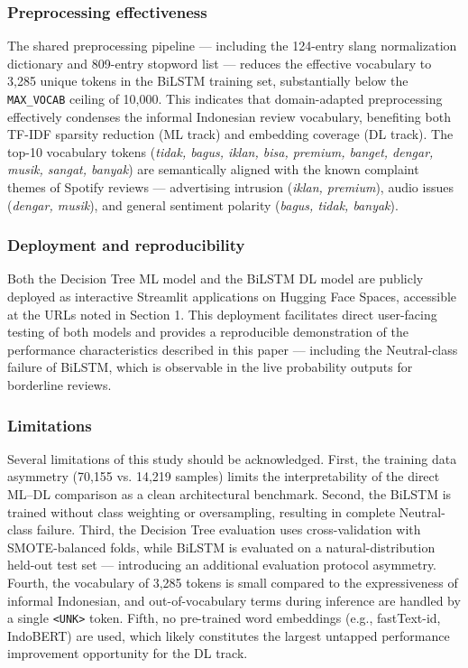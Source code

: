 \documentclass{article}
\begin{document}
\subsubsection*{Preprocessing effectiveness}
The shared preprocessing pipeline --- including the 124-entry slang normalization dictionary and 809-entry stopword list --- reduces the effective vocabulary to 3,285 unique tokens in the BiLSTM training set, substantially below the \texttt{MAX\_VOCAB} ceiling of 10,000. This indicates that domain-adapted preprocessing effectively condenses the informal Indonesian review vocabulary, benefiting both TF-IDF sparsity reduction (ML track) and embedding coverage (DL track). The top-10 vocabulary tokens (\textit{tidak, bagus, iklan, bisa, premium, banget, dengar, musik, sangat, banyak}) are semantically aligned with the known complaint themes of Spotify reviews --- advertising intrusion (\textit{iklan, premium}), audio issues (\textit{dengar, musik}), and general sentiment polarity (\textit{bagus, tidak, banyak}).

\subsubsection*{Deployment and reproducibility}
Both the Decision Tree ML model and the BiLSTM DL model are publicly deployed as interactive Streamlit applications on Hugging Face Spaces, accessible at the URLs noted in Section 1. This deployment facilitates direct user-facing testing of both models and provides a reproducible demonstration of the performance characteristics described in this paper --- including the Neutral-class failure of BiLSTM, which is observable in the live probability outputs for borderline reviews.

\subsubsection*{Limitations}
Several limitations of this study should be acknowledged. First, the training data asymmetry (70,155 vs. 14,219 samples) limits the interpretability of the direct ML--DL comparison as a clean architectural benchmark. Second, the BiLSTM is trained without class weighting or oversampling, resulting in complete Neutral-class failure. Third, the Decision Tree evaluation uses cross-validation with SMOTE-balanced folds, while BiLSTM is evaluated on a natural-distribution held-out test set --- introducing an additional evaluation protocol asymmetry. Fourth, the vocabulary of 3,285 tokens is small compared to the expressiveness of informal Indonesian, and out-of-vocabulary terms during inference are handled by a single \texttt{<UNK>} token. Fifth, no pre-trained word embeddings (e.g., fastText-id, IndoBERT) are used, which likely constitutes the largest untapped performance improvement opportunity for the DL track.
\end{document}
